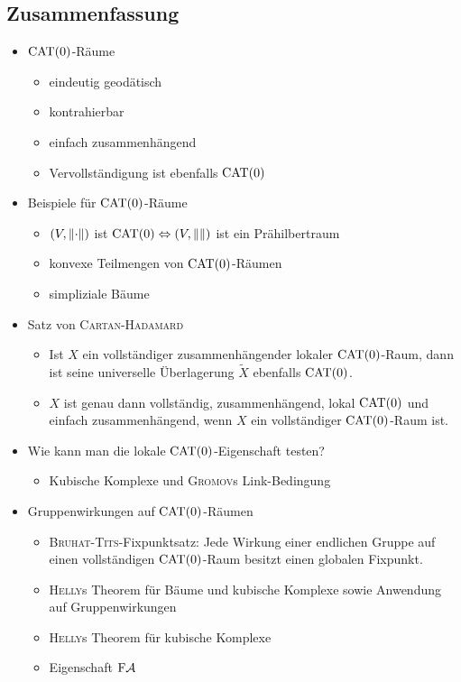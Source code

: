 \subsection*{Zusammenfassung}
\begin{itemize}
	\item $\operatorname{CAT(0)}$-Räume
		\begin{itemize}
			\item eindeutig geodätisch
			\item kontrahierbar
			\item einfach zusammenhängend
			\item Vervollständigung ist ebenfalls $\operatorname{CAT(0)}$
		\end{itemize}
	\newpage
	\item Beispiele für $\operatorname{CAT(0)}$-Räume
		\begin{itemize}
			\item $(V,\lVert\cdot\rVert)$ ist $\operatorname{CAT(0)} \Leftrightarrow (V,\lVert\rVert)$ ist ein Prähilbertraum
			\item konvexe Teilmengen von $\operatorname{CAT(0)}$-Räumen
			\item simpliziale Bäume
		\end{itemize}
	\item Satz von \textsc{Cartan-Hadamard}
		\begin{itemize}
			\item Ist $X$ ein vollständiger zusammenhängender lokaler $\operatorname{CAT(0)}$-Raum, dann ist seine universelle Überlagerung $\tilde{X}$ ebenfalls $\operatorname{CAT(0)}$.
			\item $X$ ist genau dann vollständig, zusammenhängend, lokal $\operatorname{CAT(0)}$ und einfach zusammenhängend, wenn $X$ ein vollständiger $\operatorname{CAT(0)}$-Raum ist.
		\end{itemize}
	\item Wie kann man die lokale $\operatorname{CAT(0)}$-Eigenschaft testen?
		\begin{itemize}
			\item Kubische Komplexe und \textsc{Gromov}s Link-Bedingung
		\end{itemize}
	\item Gruppenwirkungen auf $\operatorname{CAT(0)}$-Räumen
		\begin{itemize}
			\item \textsc{Bruhat-Tits}-Fixpunktsatz:
			Jede Wirkung einer endlichen Gruppe auf einen vollständigen $\operatorname{CAT(0)}$-Raum besitzt einen globalen Fixpunkt.
			\item \textsc{Helly}s Theorem für Bäume und kubische Komplexe sowie Anwendung auf Gruppenwirkungen
			\item \textsc{Helly}s Theorem für kubische Komplexe
			\item Eigenschaft $\text{F}\mathcal{A}$
		\end{itemize}
\end{itemize}
\cleardoubleoddemptypage
